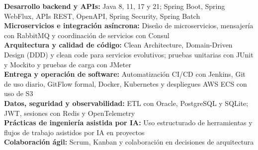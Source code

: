 \textbf{Desarrollo backend y APIs:} Java 8, 11, 17 y 21; Spring Boot, Spring WebFlux, APIs REST, OpenAPI, Spring Security, Spring Batch\\
\textbf{Microservicios e integración asíncrona:} Diseño de microservicios, mensajería con RabbitMQ y coordinación de servicios con Consul\\
\textbf{Arquitectura y calidad de código:} Clean Architecture, Domain-Driven Design (DDD) y clean code para servicios evolutivos; pruebas unitarias con JUnit y Mockito y pruebas de carga con JMeter\\
\textbf{Entrega y operación de software:} Automatización CI/CD con Jenkins, Git de uso diario, GitFlow formal, Docker, Kubernetes y despliegues AWS ECS con uso de S3\\
\textbf{Datos, seguridad y observabilidad:} ETL con Oracle, PostgreSQL y SQLite; JWT, sesiones con Redis y OpenTelemetry\\
\textbf{Prácticas de ingeniería asistida por IA:} Uso estructurado de herramientas y flujos de trabajo asistidos por IA en proyectos\\
\textbf{Colaboración ágil:} Scrum, Kanban y colaboración en decisiones de arquitectura\\
